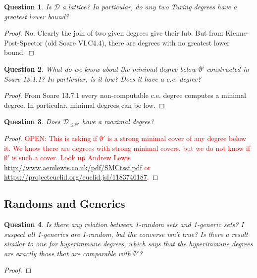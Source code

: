 \documentclass{article}
\newcommand{\OPEN}[1]{\textcolor{red}{OPEN: #1}}
\newtheorem{question}{Question}[subsection]
\begin{document}
    \begin{question}
      Is $\mathcal{D}$ a lattice? In particular, do any two Turing degrees
      have a greatest lower bound?
    \end{question}
    \begin{proof}
      No. Clearly the join of two given degrees give their lub. But from
      Klenne-Post-Spector (old Soare VI.C4.4), there are degrees with no
      greatest lower bound.
    \end{proof}

    \begin{question}
      What do we know about the minimal degree below $\emptyset'$
      constructed in Soare 13.1.1? In particular, is it low? Does it have a
      c.e. degree?
    \end{question}
    \begin{proof}
      From Soare 13.7.1 every non-computable c.e. degree computes a minimal
      degree. In particular, minimal degrees can be low.
    \end{proof}

    \begin{question}
      Does $\mathcal{D}_{\leq\emptyset'}$ have a maximal degree?
    \end{question}
    \begin{proof}
      \OPEN{This is asking if $\emptyset'$ is a strong minimal cover of any
      degree below it. We know there are degrees with strong minimal
      covers, but we do not know if $\emptyset'$ is such a cover. Look up
      Andrew Lewis \url{http://www.aemlewis.co.uk/pdf/SMCtssf.pdf} or
      \url{https://projecteuclid.org/euclid.jsl/1183746187}.}
    \end{proof}

  \subsection{Randoms and Generics}
    \begin{question}
      Is there any relation between 1-random sets and 1-generic sets? I
      suspect all 1-generics are 1-random, but the converse isn't true? Is
      there a result similar to one for hyperimmune degrees, which says
      that the hyperimmune degrees are exactly those that are comparable
      with $\emptyset'$?
    \end{question}
    \begin{proof}
    \end{proof}
\end{document}
